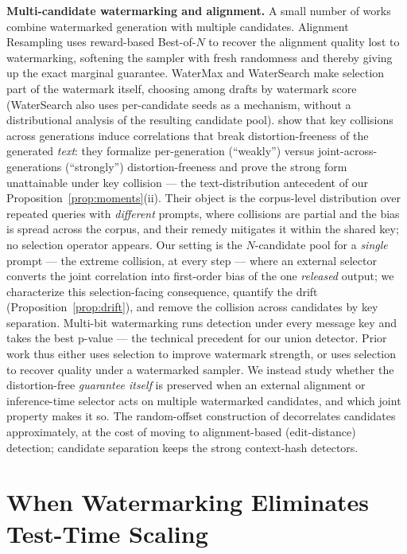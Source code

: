 \documentclass{article} %
\begin{document}
\textbf{Multi-candidate watermarking and alignment.}
A small number of works combine watermarked generation with multiple
candidates. Alignment Resampling \citep{verma2025watermarking} uses
reward-based Best-of-$N$ to recover the alignment quality lost to
watermarking, softening the sampler with fresh randomness and thereby giving
up the exact marginal guarantee. WaterMax \citep{giboulot2024watermax} and
WaterSearch \citep{watersearch2025} make selection part of the watermark
itself, choosing among drafts by watermark score (WaterSearch also uses
per-candidate seeds as a mechanism, without a distributional analysis of the
resulting candidate pool). \citet{keycollision2024} show that key collisions
across generations induce correlations that break distortion-freeness of the
generated \emph{text}: they formalize per-generation (``weakly'') versus
joint-across-generations (``strongly'') distortion-freeness and prove the
strong form unattainable under key collision --- the text-distribution
antecedent of our Proposition~\ref{prop:moments}(ii). Their object is the
corpus-level distribution over repeated queries with \emph{different}
prompts, where collisions are partial and the bias is spread across the
corpus, and their remedy mitigates it within the shared key; no selection
operator appears. Our setting is the $N$-candidate pool for a \emph{single}
prompt --- the extreme collision, at every step --- where an external
selector converts the joint correlation into first-order bias of the one
\emph{released} output; we characterize this selection-facing consequence,
quantify the drift (Proposition~\ref{prop:drift}), and remove the collision
across candidates by key separation. Multi-bit watermarking \citep{fernandez2023three} runs detection
under every message key and takes the best p-value --- the technical
precedent for our union detector. Prior work thus either uses selection to
improve watermark strength, or uses selection to recover quality under a
watermarked sampler. We instead study whether the distortion-free
\emph{guarantee itself} is preserved when an external alignment or
inference-time selector acts on multiple watermarked candidates, and which
joint property makes it so. The random-offset construction of
\citet{kuditipudi2023robust} decorrelates candidates approximately, at the
cost of moving to alignment-based (edit-distance) detection; candidate
separation keeps the strong context-hash detectors.

\section{When Watermarking Eliminates Test-Time Scaling}\label{sec:collapse}
\end{document}
